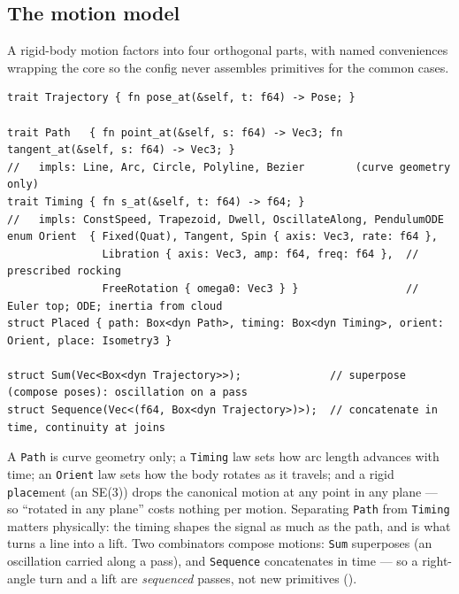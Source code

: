 \documentclass[11pt,a4paper]{article}
\theoremstyle{reqstyle}
\begin{document}
\subsection{The motion model}
\label{sec:motion}
A rigid-body motion factors into four orthogonal parts, with named conveniences wrapping the
core so the config never assembles primitives for the common cases.

\begin{lstlisting}
trait Trajectory { fn pose_at(&self, t: f64) -> Pose; }

trait Path   { fn point_at(&self, s: f64) -> Vec3; fn tangent_at(&self, s: f64) -> Vec3; }
//   impls: Line, Arc, Circle, Polyline, Bezier        (curve geometry only)
trait Timing { fn s_at(&self, t: f64) -> f64; }
//   impls: ConstSpeed, Trapezoid, Dwell, OscillateAlong, PendulumODE
enum Orient  { Fixed(Quat), Tangent, Spin { axis: Vec3, rate: f64 },
               Libration { axis: Vec3, amp: f64, freq: f64 },  // prescribed rocking
               FreeRotation { omega0: Vec3 } }                 // Euler top; ODE; inertia from cloud
struct Placed { path: Box<dyn Path>, timing: Box<dyn Timing>, orient: Orient, place: Isometry3 }

struct Sum(Vec<Box<dyn Trajectory>>);              // superpose (compose poses): oscillation on a pass
struct Sequence(Vec<(f64, Box<dyn Trajectory>)>);  // concatenate in time, continuity at joins
\end{lstlisting}

A \texttt{Path} is curve geometry only; a \texttt{Timing} law sets how arc length advances
with time; an \texttt{Orient} law sets how the body rotates as it travels; and a rigid
\texttt{place}ment (an SE(3)) drops the canonical motion at any point in any plane --- so
``rotated in any plane'' costs nothing per motion. Separating \texttt{Path} from
\texttt{Timing} matters physically: the timing shapes the signal as much as the path, and is
what turns a line into a lift. Two combinators compose motions: \texttt{Sum} superposes (an
oscillation carried along a pass), and \texttt{Sequence} concatenates in time --- so a
right-angle turn and a lift are \emph{sequenced} passes, not new primitives
().
\end{document}
